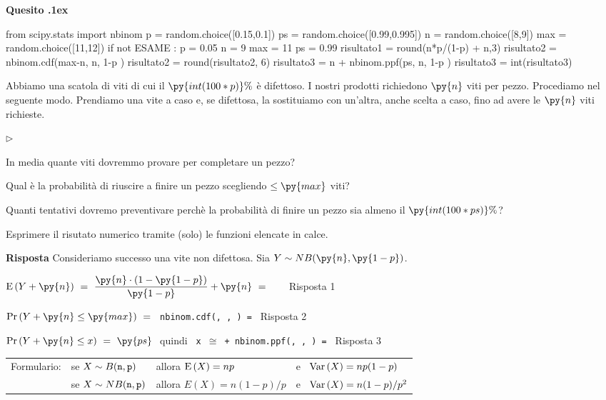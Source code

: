 \documentclass[11pt,twoside,a4paper]{article}
\newcommand{\mylabel}[1]{#1\hfill}
\renewenvironment{itemize}
  {\begin{list}{$\triangleright$}{%
   \setlength{\parskip}{0mm}
   \setlength{\topsep}{.4\baselineskip}
   \setlength{\rightmargin}{0mm}
   \setlength{\listparindent}{0mm}
   \setlength{\itemindent}{0mm}
   \setlength{\labelwidth}{2ex}
   \setlength{\itemsep}{.4\baselineskip}
   \setlength{\parsep}{0mm}
   \setlength{\partopsep}{0mm}
   \setlength{\labelsep}{1ex}
   \setlength{\leftmargin}{\labelwidth+\labelsep}
   \let\makelabel\mylabel}}{%
   \end{list}\vspace*{-1.3mm}}
\def\Ex{{\rm E\,}}
\def\Var{{\rm Var\,}}
\newcounter{quesito}
\newenvironment{question}{\bigskip\addtocounter{quesito}{1}\bigskip\bigskip\par\textbf{Quesito \thequesito.\kern1ex}}{\vspace{\parskip}}
\newenvironment{answer}{\par\textbf{Risposta\quad}}{\vspace{\parskip}}
\begin{document}
\begin{question}
\def\Pr{{\rm Pr\,}}
\def\Ex{{\rm E\,}}
\def\Var{{\rm Var\,}}
\begin{pycode}
from scipy.stats import nbinom
p  = random.choice([0.15,0.1])
ps = random.choice([0.99,0.995])
n = random.choice([8,9])
max = random.choice([11,12])
if not ESAME :
   p = 0.05
   n = 9
   max = 11
   ps = 0.99
risultato1 = round(n*p/(1-p) + n,3)
risultato2 = nbinom.cdf(max-n, n, 1-p )
risultato2 = round(risultato2, 6)
risultato3 = n + nbinom.ppf(ps, n, 1-p )
risultato3 = int(risultato3)
\end{pycode}
Abbiamo una scatola di viti di cui il $\py{int(100*p)}\%$ è difettoso. I nostri prodotti richiedono $\py{n}$ viti per pezzo. Procediamo nel seguente modo. Prendiamo una vite a caso e, se difettosa, la sostituiamo con un'altra, anche scelta a caso, fino ad avere le $\py{n}$ viti richieste.
\begin{itemize}
\item[1.] In media quante viti dovremmo provare per completare un pezzo?
\item[2.] Qual è la probabilità di riuscire a finire un pezzo scegliendo $\le\py{max}$ viti? 
\item[3.] Quanti tentativi dovremo preventivare perchè la probabilità di finire un pezzo sia almeno il $\py{int(100*ps)}\%$? 
\end{itemize}

Esprimere il risutato numerico tramite (solo) le funzioni elencate in calce. 
\begin{answer}
Consideriamo successo una vite non difettosa. Sia $Y\sim NB(\py{n},\py{1-p})$.

$\Ex(Y+\py{n})\ =\ \dfrac{\py{n}\cdot(1-\py{1-p})}{\py{1-p}}+\py{n}\ =\ ${\tt{\color{blue}\   } } {\color{blue}\hfill Risposta 1}

$\Pr(Y+\py{n}\le\py{max})\ =\ ${\tt{\color{blue}\ nbinom.cdf(, ,  ) }=  } {\color{blue}\hfill Risposta 2}

\smallskip
$\Pr(Y+\py{n}\le x)\ =\ \py{ps}\ $ quindi {\tt{\color{blue}\ x $\cong$  + nbinom.ppf(, ,  ) }=  } {\color{blue}\hfill Risposta 3}\par

\end{answer}
\end{question}


\vfill
\hrulefill

\begin{tabular}{@{}llll}
Formulario:& se $X\sim B({\tt n},{\tt p})$ & allora $\Ex(X)=np$&e \ $\Var(X)=np(1-p)$\\
           & se $X\sim NB({\tt n},{\tt p})$& allora $E(X)=n(1-p)/p$&e \ $\Var(X)=n(1-p)/p^2$\\
\end{tabular}
\end{document}
